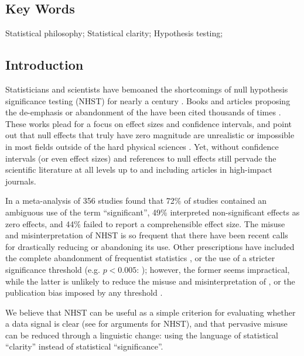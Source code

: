 \subsection*{Key Words}

\noindent Statistical philosophy; Statistical clarity; Hypothesis testing; \pval

\clearpage
\doublespacing

\subsection*{Introduction}

\noindent Statisticians and scientists have bemoaned the shortcomings of null hypothesis significance testing (NHST) for nearly a century \citep{Cohen1994}. Books and articles proposing the de-emphasis or abandonment of the \pval have been cited thousands of times \citep{Cohen1994, Goodman1999, Wilkinson1999, ZiliakandMcCloskey2008, WassersteinandLazar2016}. These works plead for a focus on effect sizes and confidence intervals, and point out that null effects that truly have zero magnitude are unrealistic or impossible in most fields outside of the hard physical sciences \citep{Meehl1990, Tukey1991, Cohen1994}. Yet, \pvals without confidence intervals (or even effect sizes) and references to null effects still pervade the scientific literature at all levels up to and including articles in high-impact journals.

In a meta-analysis of 356 studies \citet{Bernardietal.2017} found that 72\% of studies contained an ambiguous use of the term ``significant'', 49\% interpreted non-significant effects as zero effects, and 44\% failed to report a comprehensible effect size. The misuse and misinterpretation of NHST is so frequent that there have been recent calls for drastically reducing \citep{SzucsandIoannidis2017} or abandoning \citep{McShaneetal.2017} its use. Other prescriptions have included the complete abandonment of frequentist statistics \citep{The2011}, or the use of a stricter significance threshold (e.g. $p < 0.005$: \cite{Benjaminetal.2018}); however, the former seems impractical, while the latter is unlikely to reduce the misuse and misinterpretation of \pvals, or the publication bias imposed by any \pval threshold \citep{Ridleyetal.2007}.

We believe that NHST can be useful as a simple criterion for evaluating whether a data signal is clear  (see \cite{Abelson1997} for arguments for NHST), and that pervasive misuse can be reduced through a linguistic change: using the language of statistical ``clarity'' instead of statistical ``significance''.

